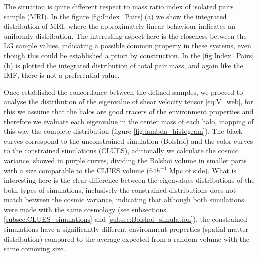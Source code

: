 \documentclass[usenatbib]{latex/mn2e}
\begin{document}
The situation is quite different respect to mass ratio index of isolated 
pairs sample (MRI). In the figure \ref{fig:Index_Pairs} (a) we show the 
integrated distribution of MRI, where the approximately linear behaviour 
indicates an uniformly distribution. The interesting aspect here is the 
closeness between the LG sample values, indicating a possible common 
property in these systems, even though this could be established a priori 
by construction. In the \ref{fig:Index_Pairs} (b) is plotted the 
integrated distribution of total pair mass, and again like the IMF, there 
is not a preferential value.


Once established the concordance between the defined samples, we proceed 
to analyse the distribution of the eigenvalue of shear velocity tensor 
\ref{eq:V_web}, for this we assume that the halos are good tracers of the 
environment properties and therefore we evaluate each eigenvalue in the 
center mass of each halo, mapping of this way the complete distribution 
(figure \ref{fig:lambda_histogram}). The black curves correspond to the 
unconstrained simulation (Bolshoi) and the color curves to the constrained 
simulations (CLUES), aditionally we calculate the cosmic variance, showed 
in purple curves, dividing the Bolshoi volume in smaller parts with a size 
comparable to the CLUES volume ($64 h^{-1 }$ Mpc of side). What is 
interesting here is the clear difference between the eigenvalues 
distributions of the both types of simulations, inclusively the 
constrained distributions does not match between the cosmic variance, 
indicating that although both simulations were made with the same cosmology 
(see subsections \ref{subsec:CLUES_simulations} and 
\ref{subsec:Bolshoi_simulation}), the constrained simulations have a 
significantly different environment properties (spatial matter distribution) 
compared to the average expected from a random volume with the same 
comoving size.
\end{document}
